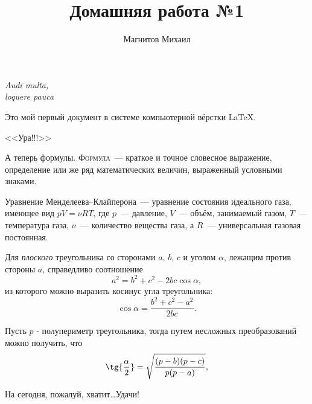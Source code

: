 \documentclass[12pt]{article}
\begin{document}
    \title{Домашняя работа №1}
    \author{Магнитов Михаил}
    \date{}
    \maketitle
    
    \begin{flushright}
        \textit{Audi multa,\\loquere pauca}
    \end{flushright}
    
    \vspace{20pt}
    Это мой первый документ в системе компьютерной вёрстки \LaTeX.
    
    \begin{center}
        \textsf{\Huge{<<Ура!!!>>}}
    \end{center}
    
    А теперь формулы. \textsc{Формула}~--- краткое и точное словесное выражение, определение или же ряд математических величин, выраженный условными знаками.
    
    \vspace*{15pt}
	\par
	Уравнение Менделеева--Клайперона~--- уравнение состояния идеального газа, имеющее вид $pV = \nu RT$, где $p$~--- давление, $V$~--- объём, занимаемый газом, $T$~--- температура газа, $\nu$~--- количество вещества газа, а $R$~--- универсальная газовая постоянная. 
	
	\vspace*{15pt}
	\par
	Для \textsl{плоского} треугольника со сторонами $a$, $b$, $c$ и уголом $\alpha$, лежащим против стороны $a$, справедливо соотношение
	$$
	a^2 = b^2 + c^2 - 2bc\cos{\alpha},
	$$
	из которого можно выразить косинус угла треугольника:
	$$
	\cos{\alpha} = \frac{b^2+c^2-a^2}{2bc}.
	$$\par
	
	Пусть $p$ - полупериметр треугольника, тогда путем несложных преобразований можно получить, что
	$$
	\tg{\frac{\alpha}{2}} = \sqrt{\frac{(p-b)(p-c)}{p(p-a)}},
	$$
	
	\vspace*{1cm}
	\begin{flushleft}
	    На сегодня, пожалуй, хватит\dots Удачи!
	\end{flushleft}
	
\end{document}
